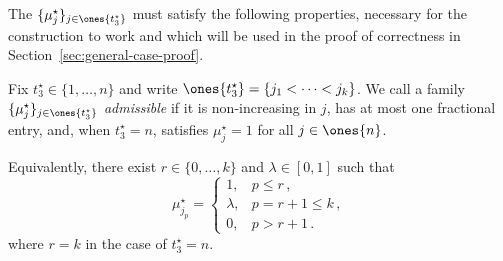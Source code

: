 The $\{\mu_j^\star\}_{j\in\ones{t_3^\star}}$ must satisfy the following properties, necessary for the construction to work and which will be used in the proof of correctness in Section~\ref{sec:general-case-proof}.

\begin{property}\label{property:admissible-frontier-input}
    Fix $t_3^\star\in\{1,\dots,n\}$ and write $\ones{t_3^\star}=\{j_1<\dots<j_k\}$. We call a family $\{\mu_j^\star\}_{j\in\ones{t_3^\star}}$ \emph{admissible} if it is non-increasing in $j$, has at most one fractional entry, and, when $t_3^\star=n$, satisfies $\mu_j^\star=1$ for all $j\in\ones{n}$.

    Equivalently, there exist $r\in\{0,\dots,k\}$ and $\lambda\in[0,1]$ such that
    \begin{equation*}
        \mu_{j_p}^\star=
        \begin{cases}
            1, & p\le r\,,\\
            \lambda, & p=r+1\le k\,,\\
            0, & p>r+1\,.
        \end{cases}
    \end{equation*}
    where $r=k$ in the case of $t_3^\star=n$. 
\end{property}

